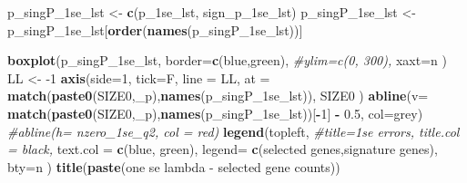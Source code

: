 \documentclass[
]{book}
\newenvironment{Shaded}{\begin{snugshade}}{\end{snugshade}}
\newcommand{\CommentTok}[1]{\textcolor[rgb]{0.56,0.35,0.01}{\textit{#1}}}
\newcommand{\DataTypeTok}[1]{\textcolor[rgb]{0.13,0.29,0.53}{#1}}
\newcommand{\DecValTok}[1]{\textcolor[rgb]{0.00,0.00,0.81}{#1}}
\newcommand{\FloatTok}[1]{\textcolor[rgb]{0.00,0.00,0.81}{#1}}
\newcommand{\KeywordTok}[1]{\textcolor[rgb]{0.13,0.29,0.53}{\textbf{#1}}}
\newcommand{\NormalTok}[1]{#1}
\newcommand{\OperatorTok}[1]{\textcolor[rgb]{0.81,0.36,0.00}{\textbf{#1}}}
\newcommand{\StringTok}[1]{\textcolor[rgb]{0.31,0.60,0.02}{#1}}
\begin{document}
\begin{Shaded}
\begin{Highlighting}[]
\NormalTok{p\_singP\_1se\_lst <{-}}\StringTok{ }\KeywordTok{c}\NormalTok{(p\_1se\_lst, sign\_p\_1se\_lst)}
\NormalTok{p\_singP\_1se\_lst <{-}}\StringTok{ }\NormalTok{p\_singP\_1se\_lst[}\KeywordTok{order}\NormalTok{(}\KeywordTok{names}\NormalTok{(p\_singP\_1se\_lst))]}

\KeywordTok{boxplot}\NormalTok{(p\_singP\_1se\_lst,}
  \DataTypeTok{border=}\KeywordTok{c}\NormalTok{(}\StringTok{\textquotesingle{}blue\textquotesingle{}}\NormalTok{,}\StringTok{\textquotesingle{}green\textquotesingle{}}\NormalTok{),}
  \CommentTok{\#ylim=c(0, 300),}
  \DataTypeTok{xaxt=}\StringTok{\textquotesingle{}n\textquotesingle{}}
\NormalTok{)}
\NormalTok{LL <{-}}\StringTok{ }\DecValTok{{-}1}
\KeywordTok{axis}\NormalTok{(}\DataTypeTok{side=}\DecValTok{1}\NormalTok{, }\DataTypeTok{tick=}\NormalTok{F, }\DataTypeTok{line =}\NormalTok{ LL,}
  \DataTypeTok{at =} \KeywordTok{match}\NormalTok{(}\KeywordTok{paste0}\NormalTok{(SIZE0,}\StringTok{\textquotesingle{}\_p\textquotesingle{}}\NormalTok{),}\KeywordTok{names}\NormalTok{(p\_singP\_1se\_lst)),}
\NormalTok{  SIZE0}
\NormalTok{ )}
\KeywordTok{abline}\NormalTok{(}\DataTypeTok{v=} \KeywordTok{match}\NormalTok{(}\KeywordTok{paste0}\NormalTok{(SIZE0,}\StringTok{\textquotesingle{}\_p\textquotesingle{}}\NormalTok{),}\KeywordTok{names}\NormalTok{(p\_singP\_1se\_lst))[}\OperatorTok{{-}}\DecValTok{1}\NormalTok{] }\OperatorTok{{-}}\StringTok{ }\FloatTok{0.5}\NormalTok{, }\DataTypeTok{col=}\StringTok{\textquotesingle{}grey\textquotesingle{}}\NormalTok{)}
\CommentTok{\#abline(h= nzero\_1se\_q2, col = \textquotesingle{}red\textquotesingle{})}
\KeywordTok{legend}\NormalTok{(}\StringTok{\textquotesingle{}topleft\textquotesingle{}}\NormalTok{,}
   \CommentTok{\#title=\textquotesingle{}1se errors\textquotesingle{}, title.col = \textquotesingle{}black\textquotesingle{},}
   \DataTypeTok{text.col =} \KeywordTok{c}\NormalTok{(}\StringTok{\textquotesingle{}blue\textquotesingle{}}\NormalTok{, }\StringTok{\textquotesingle{}green\textquotesingle{}}\NormalTok{),}
   \DataTypeTok{legend=} \KeywordTok{c}\NormalTok{(}\StringTok{\textquotesingle{}selected genes\textquotesingle{}}\NormalTok{,}\StringTok{\textquotesingle{}signature genes\textquotesingle{}}\NormalTok{),}
   \DataTypeTok{bty=}\StringTok{\textquotesingle{}n\textquotesingle{}}
\NormalTok{ )}
\KeywordTok{title}\NormalTok{(}\KeywordTok{paste}\NormalTok{(}\StringTok{\textquotesingle{}one se lambda {-} selected gene counts\textquotesingle{}}\NormalTok{))}


\end{Highlighting}
\end{Shaded}
\end{document}
